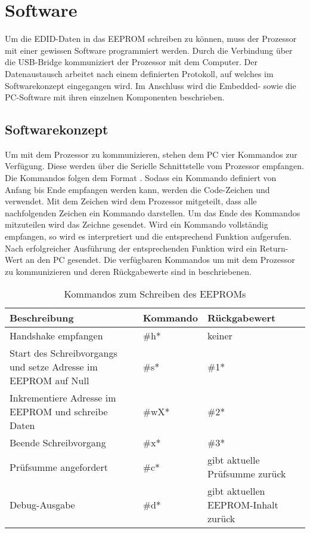 \section{Software}
\label{sec:TeilB_Software}
Um die EDID-Daten in das EEPROM schreiben zu können, muss der Prozessor mit einer gewissen Software programmiert werden. Durch die Verbindung über die USB-Bridge kommuniziert der Prozessor mit dem Computer. Der Datenaustausch arbeitet nach einem definierten Protokoll, auf welches im Softwarekonzept eingegangen wird. Im Anschluss wird die Embedded- sowie die PC-Software mit ihren einzelnen Komponenten beschrieben. 
\subsection{Softwarekonzept}
\label{softwarekonzept}
Um mit dem Prozessor zu kommunizieren, stehen dem PC vier Kommandos zur Verfügung. Diese werden über die Serielle Schnittstelle vom Prozessor empfangen. Die Kommandos folgen dem Format . Sodass ein Kommando definiert von Anfang bis Ende empfangen werden kann, werden die Code-Zeichen \code{\#} und \code{\*} verwendet. Mit dem Zeichen \code{\#} wird dem Prozessor mitgeteilt, dass alle nachfolgenden Zeichen ein Kommando darstellen. Um das Ende des Kommandos mitzuteilen wird das Zeichne \code{\*} gesendet. Wird ein Kommando vollständig empfangen, so wird es interpretiert und die entsprechend Funktion aufgerufen. Nach erfolgreicher Ausführung der entsprechenden Funktion wird ein Return-Wert an den PC gesendet. Die verfügbaren Kommandos um mit dem Prozessor zu kommunizieren und deren Rückgabewerte sind in  beschriebenen.
\begin{table}[h]
\begin{tabular}{|p{6.5cm}|p{2.5cm}|p{3.5cm}|}\hline
\rowcolor{TableBackgroundColor} 
   \textbf{Beschreibung} & \textbf{Kommando} & \textbf{Rückgabewert}	\\ \hline
	Handshake empfangen & \#h* & keiner \\ \hline    
    Start des Schreibvorgangs und setze Adresse im EEPROM auf Null & \#s* & \#1* \\ \hline
    Inkrementiere Adresse im EEPROM und schreibe Daten& \#wX* & \#2* \\ \hline
    Beende Schreibvorgang & \#x* & \#3* \\ \hline
	Prüfsumme angefordert & \#c* & gibt aktuelle Prüfsumme zurück\\ \hline    
    Debug-Ausgabe & \#d* & gibt aktuellen EEPROM-Inhalt zurück\\ \hline
\end{tabular}
\caption{Kommandos zum Schreiben des EEPROMs}
\label{tab:avr_commands}
\end{table} \\
